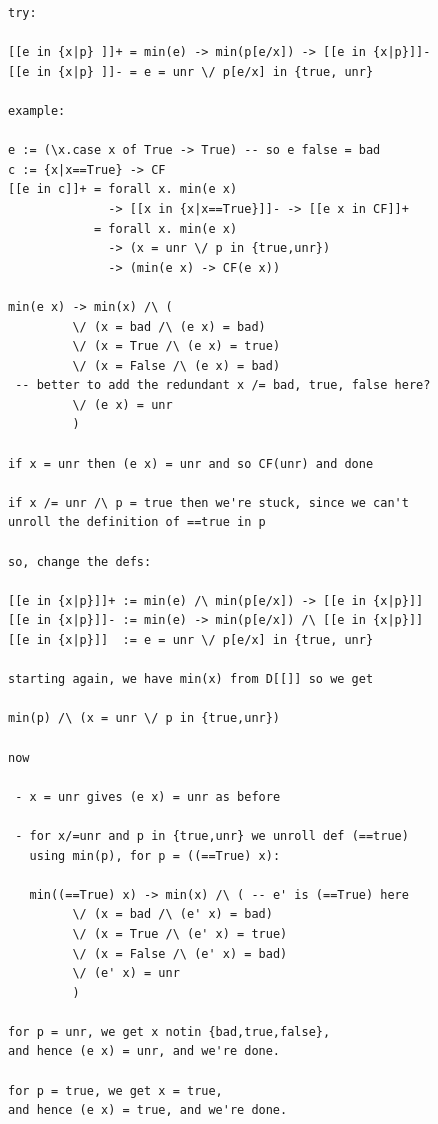 \documentclass[preprint]{sigplanconf}
\begin{document}
\begin{verbatim}
try:

[[e in {x|p} ]]+ = min(e) -> min(p[e/x]) -> [[e in {x|p}]]-
[[e in {x|p} ]]- = e = unr \/ p[e/x] in {true, unr}

example: 

e := (\x.case x of True -> True) -- so e false = bad
c := {x|x==True} -> CF
[[e in c]]+ = forall x. min(e x) 
              -> [[x in {x|x==True}]]- -> [[e x in CF]]+
            = forall x. min(e x) 
              -> (x = unr \/ p in {true,unr})
              -> (min(e x) -> CF(e x))

min(e x) -> min(x) /\ (
         \/ (x = bad /\ (e x) = bad) 
         \/ (x = True /\ (e x) = true) 
         \/ (x = False /\ (e x) = bad)
 -- better to add the redundant x /= bad, true, false here?
         \/ (e x) = unr
         )

if x = unr then (e x) = unr and so CF(unr) and done

if x /= unr /\ p = true then we're stuck, since we can't 
unroll the definition of ==true in p

so, change the defs:

[[e in {x|p}]]+ := min(e) /\ min(p[e/x]) -> [[e in {x|p}]]
[[e in {x|p}]]- := min(e) -> min(p[e/x]) /\ [[e in {x|p}]]
[[e in {x|p}]]  := e = unr \/ p[e/x] in {true, unr}

starting again, we have min(x) from D[[]] so we get 

min(p) /\ (x = unr \/ p in {true,unr})

now

 - x = unr gives (e x) = unr as before

 - for x/=unr and p in {true,unr} we unroll def (==true) 
   using min(p), for p = ((==True) x):

   min((==True) x) -> min(x) /\ ( -- e' is (==True) here
         \/ (x = bad /\ (e' x) = bad) 
         \/ (x = True /\ (e' x) = true) 
         \/ (x = False /\ (e' x) = bad)
         \/ (e' x) = unr
         )

for p = unr, we get x notin {bad,true,false}, 
and hence (e x) = unr, and we're done.

for p = true, we get x = true, 
and hence (e x) = true, and we're done.
\end{verbatim}
\end{document}
